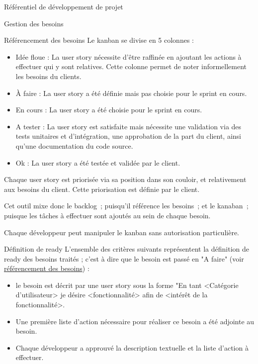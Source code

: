 \documentclass[]{article}
\begin{document}
{\begin{section}{\label{sec:Référentiel de développement de projet}Référentiel de développement de projet}
\begin{subsection}{\label{sec:Gestion des besoins}Gestion des besoins}
\begin{subsubsection}{\label{sec:Référencement des besoins}Référencement des besoins}
             Le kanban se divise en 5 colonnes :
             \begin{itemize}
                 \item Idée floue : La user story nécessite d'être raffinée en ajoutant les actions à effectuer qui y sont relatives. Cette colonne permet de noter informellement les besoins du clients.
                 \item À faire : La user story a été définie mais pas choisie pour le sprint en cours.
                 \item En cours : La user story a été choisie pour le sprint en cours.
                 \item A tester : La user story est satisfaite mais nécessite une validation via des tests unitaires et d’intégration, une approbation de la part du client, ainsi qu’une documentation du code source.
                 \item Ok : La user story a été testée et validée par le client.
             \end{itemize}

             Chaque user story est priorisée via sa position dans son couloir, et relativement aux besoins du client. Cette priorisation est définie par le client.

             Cet outil mixe donc le backlog ; puisqu’il référence les besoins ; et le kanaban ; puisque les tâches à effectuer sont ajoutés au sein de chaque besoin.

             Chaque développeur peut manipuler le kanban sans autorisation particulière.
         \end{subsubsection}


         \begin{subsubsection}{\label{sec:Définition de ready}Définition de ready}
            L'ensemble des critères suivants représentent la définition de ready des besoins traités ; c'est à dire que le besoin est passé en "A faire" (voir \hyperref[sec:Référencement des besoins]{référencement des besoins}) : 
            \begin{itemize}
                \item le besoin est décrit par une user story sous la forme "En tant <Catégorie d'utilisateur> je désire <fonctionnalité> afin de <intérêt de la fonctionnalité>.
                \item Une première liste d'action nécessaire pour réaliser ce besoin a été adjointe au besoin.
                \item Chaque développeur a approuvé la description textuelle et la liste d'action à effectuer.
            \end{itemize}
        \end{subsubsection}


\end{subsection}
\end{section}}
\end{document}
